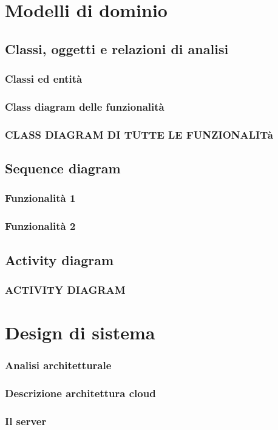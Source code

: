 \documentclass{article}
\begin{document}
	\section{Modelli di dominio}
		\subsection{Classi, oggetti e relazioni di analisi}
			\subsubsection{Classi ed entità}
			\subsubsection{Class diagram delle funzionalità}
			\subsubsection{CLASS DIAGRAM DI TUTTE LE FUNZIONALITà}
		\subsection{Sequence diagram}
			\subsubsection{Funzionalità 1}
			\subsubsection{Funzionalità 2}
		\subsection{Activity diagram}
			\subsubsection{ACTIVITY DIAGRAM}
	\section{Design di sistema}
		\subsubsection{Analisi architetturale}
		\subsubsection{Descrizione architettura cloud}
		\subsubsection{Il server}
\end{document}
